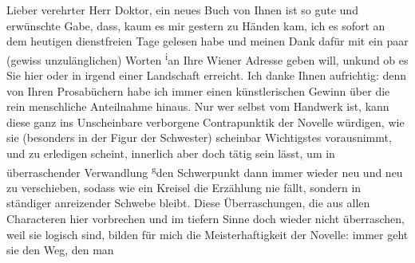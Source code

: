\pstart{}Lieber verehrter Herr Doktor,\pend\vspace{0.5em}
\pstart
           ein neues Buch von Ihnen ist
               so gute und erwünschte Gabe, dass, kaum es mir gestern zu Händen kam, ich es sofort
               an dem heutigen dienstfreien Tage gelesen habe und meinen Dank dafür mit ein paar
               (gewiss unzulänglichen) Worten \substVorne{}\textsuperscript{i}\substDazwischen{}a\substHinten{}n Ihre Wiener Adresse geben will, unkund ob es Sie hier oder in
               irgend einer Landschaft erreicht. Ich danke Ihnen aufrichtig: denn von Ihren
               Prosabüchern habe ich immer einen künstlerischen Gewinn über die rein menschliche
               Anteilnahme hinaus. Nur wer selbst vom Handwerk ist, kann diese ganz ins Unscheinbare
               verborgene Contrapunktik der Novelle würdigen, wie sie (besonders in der Figur der Schwester) scheinbar Wichtigstes
               vorausnimmt, {\pb}und zu erledigen scheint,
               innerlich aber doch tätig sein lässt, um in überraschender Verwandlung \substVorne{}\textsuperscript{g}\substDazwischen{}d\substHinten{}en
               Schwerpunkt dann immer wieder neu und neu zu verschieben, sodass wie ein Kreisel die
                  Erzählung nie fällt,
               sondern in ständiger anreizender Schwebe bleibt. Diese Überraschungen, die aus allen
               Characteren hier vorbrechen und im tiefern Sinne doch wieder nicht überraschen, weil
               sie logisch sind, bilden für mich die Meisterhaftigkeit der Novelle: immer geht sie den Weg, den man
